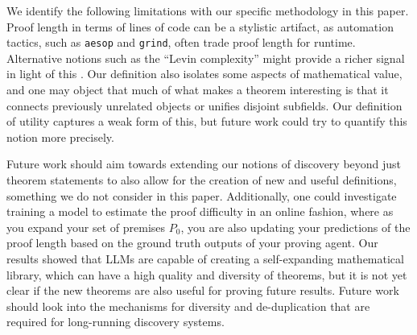 We identify the following limitations with our specific methodology in this paper.
%
Proof length in terms of lines of code can be a stylistic artifact, as automation tactics, such as \texttt{aesop} and \texttt{grind}, often trade proof length for runtime.
%
Alternative notions such as the ``Levin complexity'' might provide a richer signal in light of this \citep{livitanyi2008}.
%
Our definition also isolates some aspects of mathematical value, and one may object that much of what makes a theorem interesting is that it connects previously unrelated objects or unifies disjoint subfields.
%
Our definition of utility captures a weak form of this, but future work could try to quantify this notion more precisely.
%

Future work should aim towards extending our notions of discovery beyond just theorem statements to also allow for the creation of new and useful definitions, something we do not consider in this paper. 
%
Additionally, one could investigate training a model to estimate the proof difficulty in an online fashion, where as you expand your set of premises $P_0$, you are also updating your predictions of the proof length based on the ground truth outputs of your proving agent. 
%
Our results showed that LLMs are capable of creating a self-expanding mathematical library, which can have a high quality and diversity of theorems, but it is not yet clear if the new theorems are also useful for proving future results. 
%
Future work should look into the mechanisms for diversity and de-duplication that are required for long-running discovery systems.
